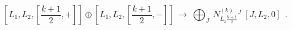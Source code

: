 \begin{equation}\label{mmADflowIII}
[L_{1},L_{2},[{\textstyle \frac{k+1}{2}},+]]\oplus
[L_{1},L_{2},[{\textstyle \frac{k+1}{2}},-]]\
\longrightarrow \ \bigoplus_{J}\ N^{(k)}_{L_{1}\frac{k+1}{2}}{}^{J}\ 
[J,L_{2},0]\ \ .
\end{equation}

